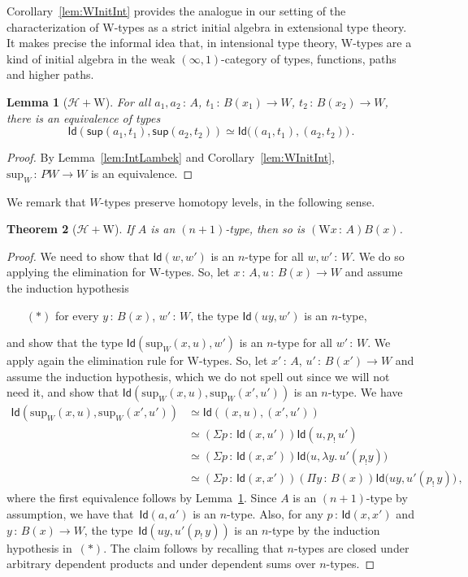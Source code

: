 \documentclass[10pt,a4paper,oneside,reqno]{amsart}
\numberwithin{equation}{section}
\theoremstyle{mythm}
\newtheorem{theorem}{Theorem}[subsection]
\newtheorem{lemma}[theorem]{Lemma}
\theoremstyle{mydef}
\theoremstyle{myrmk}
\newcommand{\co}{\,{:}\,}
\newcommand{\Hint}{\mathcal{H}}
\newcommand{\Id}{\mathsf{Id}}
\newcommand{\W}{\mathrm{W}}
\newcommand{\wsup}{\mathsf{sup}}
\renewcommand{\sup}{\mathrm{sup}}
\begin{document}
Corollary~\ref{lem:WInitInt} provides the analogue in our setting of the characterization of W-types as a strict initial algebra in extensional type theory. It makes precise the informal idea that, in intensional type theory, W-types are a kind of initial algebra in the weak $(\infty, 1)$-category of types, functions, paths and higher paths.  

\begin{lemma}[$\Hint + \W$]\label{lem:suppath}
For all $a_1,a_2 \co A$, $t_1 \co B(x_1) \to W$, $t_2 \co B(x_2) \to W$, there is an equivalence of types
\[ 
\Id ( \wsup(a_1,t_1),  \wsup(a_2,t_2)  ) \simeq  \Id \big( (a_1,t_1), (a_2,t_2) \big) \, . 
\]
\end{lemma}

\begin{proof}
By Lemma~\ref{lem:IntLambek} and Corollary~\ref{lem:WInitInt}, $\sup_W \co PW \to W$ is an equivalence.
\end{proof}





We  remark that $W$-types  preserve homotopy levels, in the following sense.

\begin{theorem}[$\Hint + \W$]
If $A$ is an $(n+1)$-type, then so is $(\W x \co A) B(x)$.
\end{theorem}


\begin{proof}
We need to show that $\Id(w, w')$ is an $n$-type for all $w, w' \co W$. We do so applying the elimination for W-types.
So, let $x \co A, u \co B(x) \to W$ and assume the induction hypothesis 
\begin{itemize}
\item[$(\ast)$] for every $y \co B(x)$, $w' \co W$, the type $\Id( uy ,w')$ is an $n$-type, 
\end{itemize}
and show that  the type $\Id(\sup_W(x,u), w')$ is an $n$-type for all $w' \co W$. We apply again the elimination rule for W-types. So, let   $x' \co A$, $u' \co B(x') \to W$ and assume the induction hypothesis, which we do not spell out since we will not need it, and show that $\Id( \sup_W(x,u) , \sup_W(x',u'))$ is an $n$-type. We have
\begin{align*} 
\Id(\sup_W(x,u), \sup_W(x',u'))
& \simeq \Id((x,u) , (x',u')) \\
& \simeq (\Sigma p \co \Id(x, u')) \Id( u , p_{!} \, u' )   \\
& \simeq (\Sigma p \co \Id(x,x'))  \Id\big(u , \lambda y. \,  u'( p_{!} y)\big) \\
& \simeq (\Sigma p \co \Id(x,x')) (\Pi y \co B(x)) \Id \big( uy  , u'(p_{!} \, y)\big) \, , 
\end{align*}
where the first equivalence follows by Lemma~\ref{lem:suppath}. Since $A$ is an $(n+1)$-type by assumption, we have 
that~$\Id(a,a')$ is an $n$-type. Also, for any $p \co \Id(x,x')$ and $y \co B(x) \to W$, the type~$\Id(uy ,  u'(p_{!} \, y))$ is an $n$-type by the 
induction 
hypothesis in~$(\ast)$. The claim follows by recalling that $n$-types are closed under arbitrary dependent products and under dependent 
sums over $n$-types. 
\end{proof}
\end{document}
